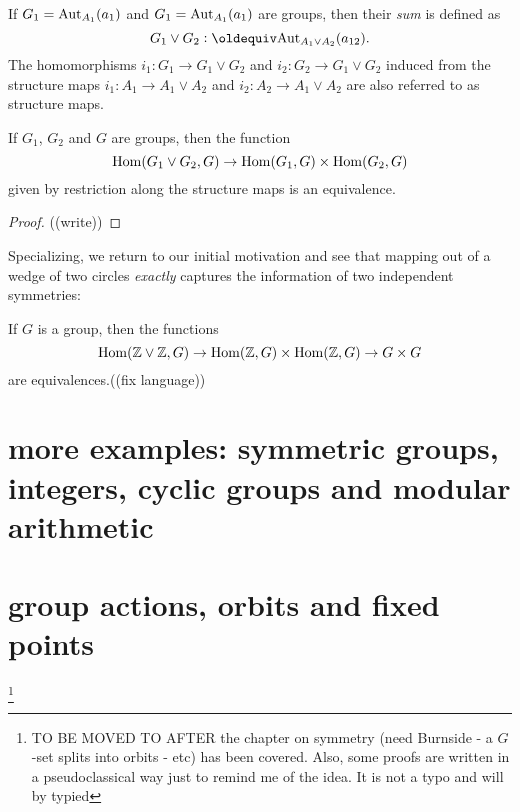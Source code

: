 \begin{definition}
  \label{def:sumofgroup}
  If $G_1=\mathrm{Aut}_{A_1}(a_1)$ and $G_1=\mathrm{Aut}_{A_1}(a_1)$ are groups, then their \emph{sum} is defined as
  $$G_1\vee G_2\defequi \aut_{A_1\vee A_2}(a_{12}).$$ The homomorphisms $i_1:G_1\to G_1\vee G_2$ and $i_2:G_2\to G_1\vee G_2$ induced from the structure maps  $i_1:A_1\to A_1\vee A_2$ and  $i_2:A_2\to A_1\vee A_2$ are also referred to as structure maps.
\end{definition}
\begin{lemma}
  \label{lem:sumofgroupsISsum} If $G_1$, $G_2$ and $G$ are groups, then the function
  $$\mathrm{Hom}(G_1\vee G_2,G)\to\mathrm{Hom}(G_1,G)\times\mathrm{Hom}(G_2,G)$$ 
given by restriction along the structure maps is an equivalence.
\end{lemma}
\begin{proof}
  ((write))
\end{proof}
Specializing, we return to our initial motivation and see that mapping out of a wedge of two circles \emph{exactly} captures the information of two independent symmetries:
\begin{corollary}
  \label{cor:ZplusZuniv}
  If $G$ is a group, then the functions
  $$\mathrm{Hom}(\mathbb{Z}\vee\mathbb{Z},G)\to \mathrm{Hom}(\mathbb{Z},G)\times\mathrm{Hom}(\mathbb{Z},G)\to G\times G$$
  are equivalences.((fix language))
\end{corollary}


\section{more examples: symmetric groups, integers, cyclic groups and modular arithmetic}
\section{group actions, orbits and fixed points}

\footnote{TO BE MOVED TO AFTER the chapter on symmetry (need Burnside -  a $G$-set splits into orbits - etc) has been covered.  
Also, some proofs are written in a pseudoclassical way just to remind me of the idea.  It is not a typo and will by typied}

